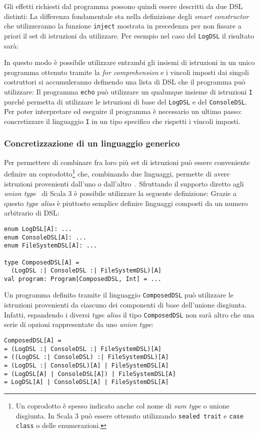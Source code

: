 Gli effetti richiesti dal programma possono quindi essere descritti da due DSL distinti:
La differenza fondamentale sta nella definizione degli \emph{smart constructor} che utilizzeranno la funzione \lstinline{inject} mostrata in precedenza per non fissare a priori il set di istruzioni da utilizzare. Per esempio nel caso del \lstinline{LogDSL} il risultato sarà:

In questo modo è possibile utilizzare entrambi gli insiemi di istruzioni in un unico programma ottenuto tramite la \emph{for comprehension} e i vincoli imposti dai singoli costruttori si accumuleranno definendo una lista di DSL che il programma può utilizzare:
Il programma \lstinline{echo} può utilizzare un qualunque insieme di istruzioni \lstinline{I} purché permetta di utilizzare le istruzioni di base del \lstinline{LogDSL} e del \lstinline{ConsoleDSL}. Per poter interpretare ed eseguire il programma è necessario un ultimo passo: concretizzare il linguaggio \lstinline{I} in un tipo specifico che rispetti i vincoli imposti.

\subsubsection{Concretizzazione di un linguaggio generico}
Per permettere di combinare fra loro più set di istruzioni può essere conveniente definire un coprodotto\footnote{Un coprodotto è spesso indicato anche col nome di \emph{sum type} o unione disgiunta. In Scala 3 può essere ottenuto utilizzando \lstinline{sealed trait} e \lstinline{case class} o delle enumerazioni.} che, combinando due linguaggi, permette di avere istruzioni provenienti dall'uno o dall'altro~\cite{cit:data-types-a-la-carte}.
Sfruttando il supporto diretto agli \emph{union type}~\cite{cit:scala3-union-types} di Scala 3 è possibile utilizzare la seguente definizione:
Grazie a questo \emph{type alias} è piuttosto semplice definire linguaggi composti da un numero arbitrario di DSL:
\begin{lstlisting}[language=scala3]
enum LogDSL[A]: ... 
enum ConsoleDSL[A]: ...
enum FileSystemDSL[A]: ...

type ComposedDSL[A] =
  (LogDSL :| ConsoleDSL :| FileSystemDSL)[A]
val program: Program[ComposedDSL, Int] = ...
\end{lstlisting}
Un programma definito tramite il linguaggio \lstinline{ComposedDSL} può utilizzare le istruzioni provenienti da ciascuno dei componenti di base dell'unione disgiunta. Infatti, espandendo i diversi \emph{type alias} il tipo \lstinline{ComposedDSL} non sarà altro che una serie di opzioni rappresentate da uno \emph{union type}:
\begin{lstlisting}
ComposedDSL[A] =
= (LogDSL :| ConsoleDSL :| FileSystemDSL)[A]
= ((LogDSL :| ConsoleDSL) :| FileSystemDSL)[A]
= (LogDSL :| ConsoleDSL)[A] | FileSystemDSL[A]
= (LogDSL[A] | ConsoleDSL[A]) | FileSystemDSL[A]
= LogDSL[A] | ConsoleDSL[A] | FileSystemDSL[A]
\end{lstlisting}

